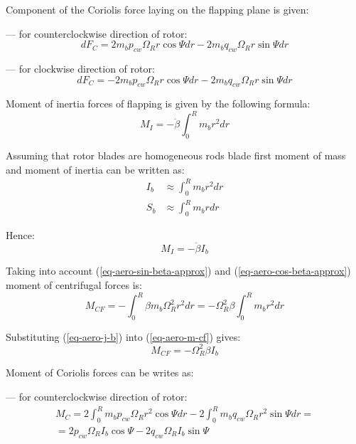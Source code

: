 Component of the Coriolis force laying on the flapping plane is given:

--- for counterclockwise direction of rotor:
\begin{equation}
  dF_C =
    2 m_b p_{cw} \Omega_R r \cos \Psi dr
  - 2 m_b q_{cw} \Omega_R r \sin \Psi dr
\end{equation}

--- for clockwise direction of rotor:
\begin{equation}
  dF_C =
  - 2 m_b p_{cw} \Omega_R r \cos \Psi dr
  - 2 m_b q_{cw} \Omega_R r \sin \Psi dr
\end{equation}

Moment of inertia forces of flapping is given by the following formula:
\begin{equation}
  M_I = - \ddot \beta \int_{0}^{R} m_b r^2 dr
\end{equation}

Assuming that rotor blades are homogeneous rods blade first moment of mass and moment of inertia can be written as: \cite{NASA-TT-F-494}
\begin{align}
  \label{eq-aero-j-b}
  I_b &\approx \int_{0}^{R} m_b r^2 dr \\
  \label{eq-aero-s-b}
  S_b &\approx \int_{0}^{R} m_b r dr
\end{align}

Hence:
\begin{equation}
  M_I = - \ddot \beta I_b
\end{equation}

Taking into account (\ref{eq-aero-sin-beta-approx}) and (\ref{eq-aero-cos-beta-approx}) moment of centrifugal forces is:
\begin{equation}
  \label{eq-aero-m-cf}
  M_{CF} =
  - \int_{0}^{R} \beta m_b \Omega_R^2 r^2 dr =
  - \Omega_R^2 \beta \int_{0}^{R} m_b r^2 dr
\end{equation}

Substituting (\ref{eq-aero-j-b}) into (\ref{eq-aero-m-cf}) gives:
\begin{equation}
  M_{CF} = - \Omega_R^2 \beta I_b
\end{equation}

Moment of Coriolis forces can be writes as:

--- for counterclockwise direction of rotor:
\begin{multline}
  M_C =
    2 \int_{0}^{R} m_b p_{cw} \Omega_R r^2 \cos \Psi dr
  - 2 \int_{0}^{R} m_b q_{cw} \Omega_R r^2 \sin \Psi dr
  = \\ =
  2 p_{cw} \Omega_R I_b \cos \Psi - 2 q_{cw} \Omega_R I_b \sin \Psi
\end{multline}


